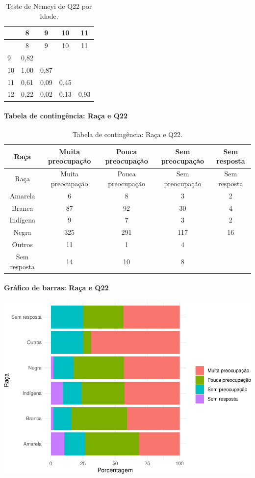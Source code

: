 \documentclass[]{article}
\let\oldparagraph\paragraph
\renewcommand{\paragraph}[1]{\oldparagraph{#1}\mbox{}}
\begin{document}
\begin{longtable}[]{@{}lcccc@{}}
\caption{\label{tab:unnamed-chunk-391}Teste de Nemeyi de Q22 por Idade.}\tabularnewline
\toprule
& 8 & 9 & 10 & 11\tabularnewline
\midrule
\endfirsthead
\toprule
& 8 & 9 & 10 & 11\tabularnewline
\midrule
\endhead
9 & 0,82 & & &\tabularnewline
10 & 1,00 & 0,87 & &\tabularnewline
11 & 0,61 & 0,09 & 0,45 &\tabularnewline
12 & 0,22 & 0,02 & 0,13 & 0,93\tabularnewline
\bottomrule
\end{longtable}

\cleardoublepage

\hypertarget{tabela-de-continguxeancia-rauxe7a-e-q22}{%
\paragraph{Tabela de contingência: Raça e Q22}\label{tabela-de-continguxeancia-rauxe7a-e-q22}}

\begin{longtable}[]{@{}ccccc@{}}
\caption{\label{tab:unnamed-chunk-392}Tabela de contingência: Raça e Q22.}\tabularnewline
\toprule
Raça & Muita preocupação & Pouca preocupação & Sem preocupação & Sem resposta\tabularnewline
\midrule
\endfirsthead
\toprule
Raça & Muita preocupação & Pouca preocupação & Sem preocupação & Sem resposta\tabularnewline
\midrule
\endhead
Amarela & 6 & 8 & 3 & 2\tabularnewline
Branca & 87 & 92 & 30 & 4\tabularnewline
Indígena & 9 & 7 & 3 & 2\tabularnewline
Negra & 325 & 291 & 117 & 16\tabularnewline
Outros & 11 & 1 & 4 &\tabularnewline
Sem resposta & 14 & 10 & 8 &\tabularnewline
\bottomrule
\end{longtable}

\hypertarget{gruxe1fico-de-barras-rauxe7a-e-q22}{%
\paragraph{Gráfico de barras: Raça e Q22}\label{gruxe1fico-de-barras-rauxe7a-e-q22}}

\begin{center}\includegraphics[width=0.75\linewidth]{relatorio_files/figure-latex/unnamed-chunk-393-1} \end{center}
\end{document}
